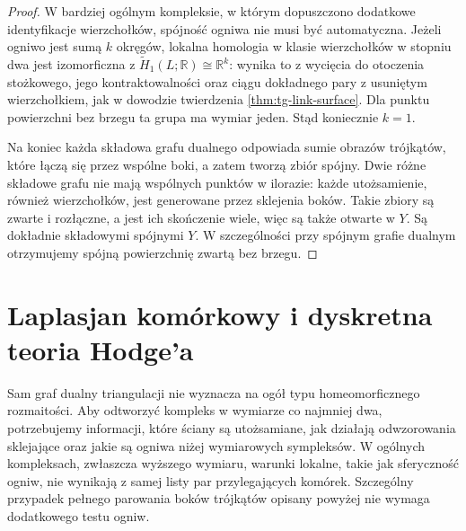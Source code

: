 \begin{proof}
W bardziej ogólnym kompleksie, w którym dopuszczono
dodatkowe identyfikacje wierzchołków, spójność ogniwa
nie musi być automatyczna. Jeżeli ogniwo jest sumą
$k$ okręgów,
lokalna homologia w klasie wierzchołków w stopniu
dwa jest izomorficzna z $\widetilde H_1(L;\mathbb R)
\cong\mathbb R^k$: wynika to z wycięcia do otoczenia
stożkowego, jego kontraktowalności oraz ciągu
dokładnego pary z usuniętym wierzchołkiem,
jak w dowodzie twierdzenia \ref{thm:tg-link-surface}.
Dla punktu powierzchni bez brzegu ta grupa ma
wymiar jeden. Stąd koniecznie $k=1$.

Na koniec każda składowa grafu dualnego odpowiada
sumie obrazów trójkątów, które łączą się przez
wspólne boki, a zatem tworzą zbiór spójny.
Dwie różne składowe grafu nie mają wspólnych
punktów w ilorazie: każde utożsamienie, również
wierzchołków, jest generowane przez sklejenia boków.
Takie zbiory są zwarte i rozłączne, a jest ich
skończenie wiele, więc są także otwarte w $Y$.
Są dokładnie składowymi spójnymi $Y$.
W szczególności przy spójnym grafie dualnym
otrzymujemy spójną powierzchnię zwartą bez brzegu.
\end{proof}

\section{Laplasjan komórkowy i dyskretna teoria Hodge'a}
\label{sec:tg-cellular-hodge}

\begin{uwaga}
Sam graf dualny triangulacji nie wyznacza na ogół typu
homeomorficznego rozmaitości. Aby odtworzyć kompleks
w wymiarze co najmniej dwa, potrzebujemy informacji,
które ściany są utożsamiane, jak działają odwzorowania
sklejające oraz jakie są ogniwa niżej wymiarowych sympleksów.
W ogólnych kompleksach, zwłaszcza wyższego wymiaru,
warunki lokalne, takie jak sferyczność ogniw, nie wynikają
z samej listy par przylegających komórek. Szczególny
przypadek pełnego parowania boków trójkątów
opisany powyżej nie wymaga dodatkowego testu ogniw.
\end{uwaga}

